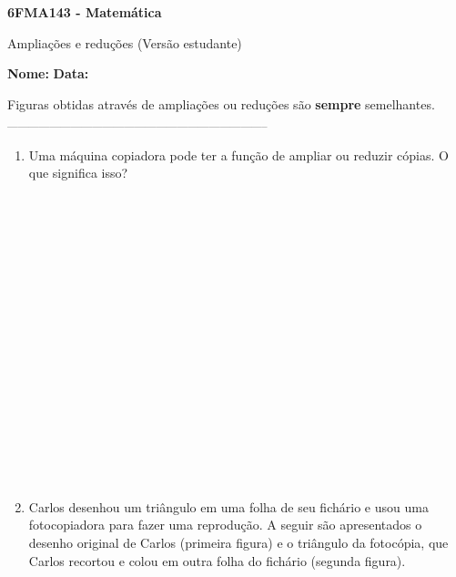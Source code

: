 \documentclass[a4paper,14pt]{article}
\begin{document}
	
	\noindent\textbf{6FMA143 - Matemática} 
	
	\begin{center}Ampliações e reduções (Versão estudante)
	\end{center}
	
	\noindent\textbf{Nome:} \underline{\hspace{10cm}}
	\noindent\textbf{Data:} \underline{\hspace{4cm}}
	
	
	\begin{multicols}{2}
	    \noindent Figuras obtidas através de ampliações ou reduções são \textbf{sempre} semelhantes. \\
		\noindent\textsubscript{--------------------------------------------------------------------------}
		\begin{enumerate} 
			\item Uma máquina copiadora pode ter a função de ampliar ou reduzir cópias. O que significa isso? \\\\\\\\\\\\\\\\\\\\\\\\\\\\\\\\\\\\
			\item Carlos desenhou um triângulo em uma folha de seu fichário e usou uma fotocopiadora para fazer uma reprodução. A seguir são apresentados o desenho original de Carlos (primeira figura) e o triângulo da fotocópia, que Carlos recortou e colou em outra folha do fichário (segunda figura). \\

\end{enumerate}
\end{multicols}
\end{document}

